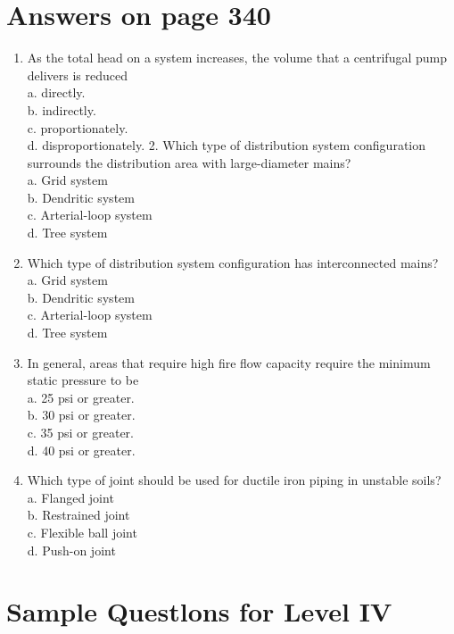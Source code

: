 \documentclass[10pt]{article}
\begin{document}
\section{Answers on page 340}
\begin{enumerate}
  \item As the total head on a system increases, the volume that a centrifugal pump delivers is reduced\\
a. directly.\\
b. indirectly.\\
c. proportionately.\\
d. disproportionately. 2. Which type of distribution system configuration surrounds the distribution area with large-diameter mains?\\
a. Grid system\\
b. Dendritic system\\
c. Arterial-loop system\\
d. Tree system

  \item Which type of distribution system configuration has interconnected mains?\\
a. Grid system\\
b. Dendritic system\\
c. Arterial-loop system\\
d. Tree system

  \item In general, areas that require high fire flow capacity require the minimum static pressure to be\\
a. 25 psi or greater.\\
b. 30 psi or greater.\\
c. 35 psi or greater.\\
d. 40 psi or greater.

  \item Which type of joint should be used for ductile iron piping in unstable soils?\\
a. Flanged joint\\
b. Restrained joint\\
c. Flexible ball joint\\
d. Push-on joint

\end{enumerate}

\section{Sample Questlons for Level IV}
\end{document}
